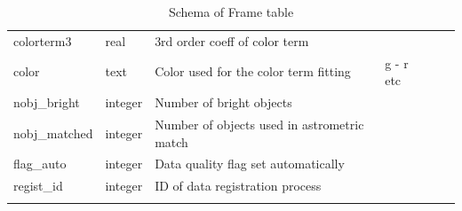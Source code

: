\documentclass[12pt]{article}
\begin{document}
\begin{table}[thbp]
\begin{center}
{\begin{tabular}{llllll}
colorterm3 & real & 3rd order coeff of color term                       &                            &             &   \\
color & text & Color used for the color term fitting               & g - r  etc                 &             &   \\
nobj\_bright & integer & Number of bright objects                            &                            &             &   \\
nobj\_matched & integer & Number of objects used in astrometric match         &                            &             &   \\
flag\_auto & integer & Data quality flag set automatically                 &                            &             &   \\
regist\_id & integer & ID of data registration process                     &                            &             &   \\
\hline\\
\end{tabular}
}
\caption{Schema of Frame table}
\end{center}
\end{table}
\end{document}
